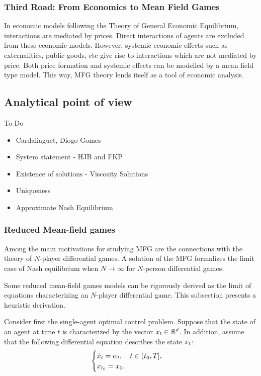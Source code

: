 \documentclass{article}
\begin{document}
\subsubsection{Third Road: From Economics to Mean Field Games}
In economic models following the Theory of General Economic Equilibrium, interactions are mediated by prices. Direct interactions of agents are excluded from these economic models. However, systemic economic effects such as externalities, public goods, etc give rise to interactions which are not mediated by price. Both price formation and systemic effects can be modelled by a mean field type model. This way, MFG theory lends itself as a tool of economic analysis.



\subsection{Analytical point of view}

To Do
\begin{itemize}
    \item Cardaliaguet, Diogo Gomes
    \item System statement - HJB and FKP
    \item Existence of solutions - Viscosity Solutions
    \item Uniqueness
    \item Approximate Nash Equilibrium
\end{itemize}

\subsubsection{Reduced Mean-field games}\label{reduced_mfg}
Among the main motivations for studying MFG are the connections with
 the theory of $N$-player differential games. A solution of the MFG formalizes 
 the limit case of Nash equilibrium when $N \to \infty$ for $N$-person differential games.

Some reduced mean-field games models can be rigorously derived as the limit 
of equations characterizing an $N$-player differential game. This subsection presents a heuristic derivation.

Consider first the single-agent optimal control problem.
Suppose that the state of an agent at time $t$ is characterized by the vector 
$x_t \in \mathbb{R}^d$.
In addition, assume that the following differential equation describes the state $x_t$:
\begin{equation}\label{reduced_mfg:state_evolution}
\begin{cases}
    \dot{ x}_t = {\alpha}_t,\quad t\in (t_0,T],\\
    {x}_{t_0} = x_0.
\end{cases}
\end{equation}
\end{document}
